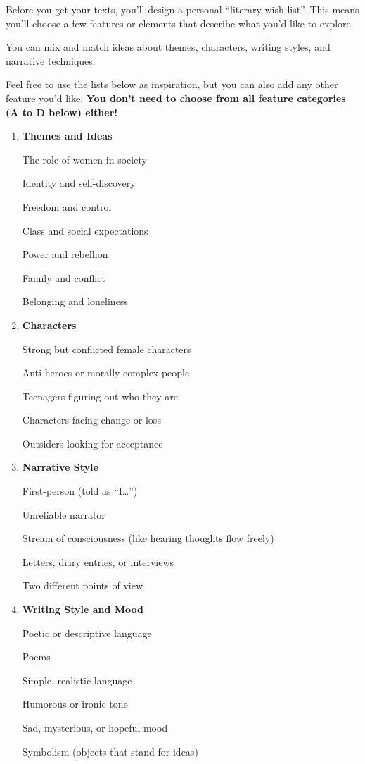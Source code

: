 \documentclass[12pt]{article}
\newcounter{exercise}
\newcommand{\exercisetitle}[1]{%
\stepcounter{exercise}
  \vspace{0.5cm}
  \colorbox{maincolor}{%
    \makebox[\dimexpr\linewidth-2\fboxsep][l]{%
      \textcolor{white}{\faPen\ Assignment \theexercise #1}%
    }%
  }
  \vspace{0.3cm}
}
\begin{document}
\exercisetitle{: Generate your wish list and prompt the AI}

Before you get your texts, you’ll design a personal “literary wish list”. This means you’ll choose a few features or elements that describe what you’d like to explore.

You can mix and match ideas about themes, characters, writing styles, and narrative techniques.

Feel free to use the lists below as inspiration, but you can also add any other feature you'd like. \textbf{You don't need to choose from all feature categories (A to D below) either!}

\begin{enumerate}[label=\Alph*.]
    \item \textbf{Themes and Ideas}

The role of women in society

Identity and self-discovery

Freedom and control

Class and social expectations

Power and rebellion

Family and conflict

Belonging and loneliness

\item \textbf{Characters}

Strong but conflicted female characters

Anti-heroes or morally complex people

Teenagers figuring out who they are

Characters facing change or loss

Outsiders looking for acceptance

\item \textbf{Narrative Style}

First-person (told as “I…”)

Unreliable narrator

Stream of consciousness (like hearing thoughts flow freely)

Letters, diary entries, or interviews

Two different points of view

\item \textbf{Writing Style and Mood}

Poetic or descriptive language

Poems

Simple, realistic language

Humorous or ironic tone

Sad, mysterious, or hopeful mood

Symbolism (objects that stand for ideas)

\end{enumerate}
\end{document}
